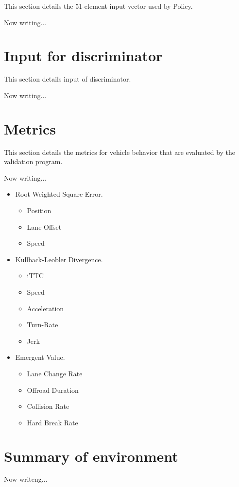 This section details the 51-element input vector used by Policy.

Now writing...

\section{Input for discriminator}


This section details input of discriminator.

Now writing...

\section{Metrics}


This section details the metrics for vehicle behavior that are evaluated by the validation program.

Now writing...

\begin{itemize}
\item Root Weighted Square Error.
\begin{itemize}
\item Position
\item Lane Offset
\item Speed
\end{itemize}
\item Kullback-Leobler Divergence.
\begin{itemize}
\item iTTC
\item Speed
\item Acceleration
\item Turn-Rate
\item Jerk
\end{itemize}
\item Emergent Value.
\begin{itemize}
\item Lane Change Rate
\item Offroad Duration
\item Collision Rate
\item Hard Break Rate
\end{itemize}
\end{itemize}

\section{Summary of environment}

Now writeng...

